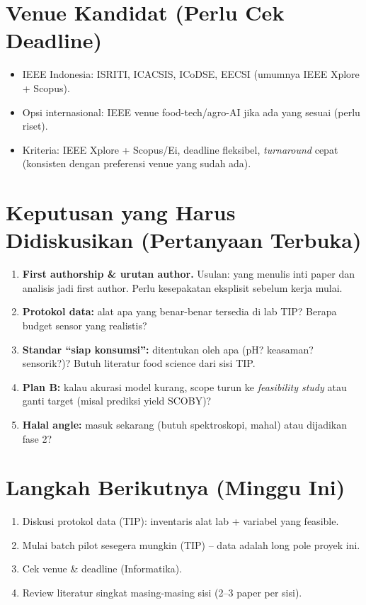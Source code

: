 \documentclass[conference]{IEEEtran}
\begin{document}
\section{Venue Kandidat (Perlu Cek Deadline)}
\begin{itemize}
    \item IEEE Indonesia: ISRITI, ICACSIS, ICoDSE, EECSI (umumnya IEEE Xplore + Scopus).
    \item Opsi internasional: IEEE venue food-tech/agro-AI jika ada yang sesuai (perlu riset).
    \item Kriteria: IEEE Xplore + Scopus/Ei, deadline fleksibel, \emph{turnaround} cepat (konsisten dengan preferensi venue yang sudah ada).
\end{itemize}

\section{Keputusan yang Harus Didiskusikan (Pertanyaan Terbuka)}
\begin{enumerate}
    \item \textbf{First authorship \& urutan author.} Usulan: yang menulis inti paper dan analisis jadi first author. Perlu kesepakatan eksplisit sebelum kerja mulai.
    \item \textbf{Protokol data:} alat apa yang benar-benar tersedia di lab TIP? Berapa budget sensor yang realistis?
    \item \textbf{Standar ``siap konsumsi'':} ditentukan oleh apa (pH? keasaman? sensorik?)? Butuh literatur food science dari sisi TIP.
    \item \textbf{Plan B:} kalau akurasi model kurang, scope turun ke \emph{feasibility study} atau ganti target (misal prediksi yield SCOBY)?
    \item \textbf{Halal angle:} masuk sekarang (butuh spektroskopi, mahal) atau dijadikan fase 2?
\end{enumerate}

\section{Langkah Berikutnya (Minggu Ini)}
\begin{enumerate}
    \item Diskusi protokol data (TIP): inventaris alat lab + variabel yang feasible.
    \item Mulai batch pilot sesegera mungkin (TIP) -- data adalah long pole proyek ini.
    \item Cek venue \& deadline (Informatika).
    \item Review literatur singkat masing-masing sisi (2--3 paper per sisi).
\end{enumerate}
\end{document}
